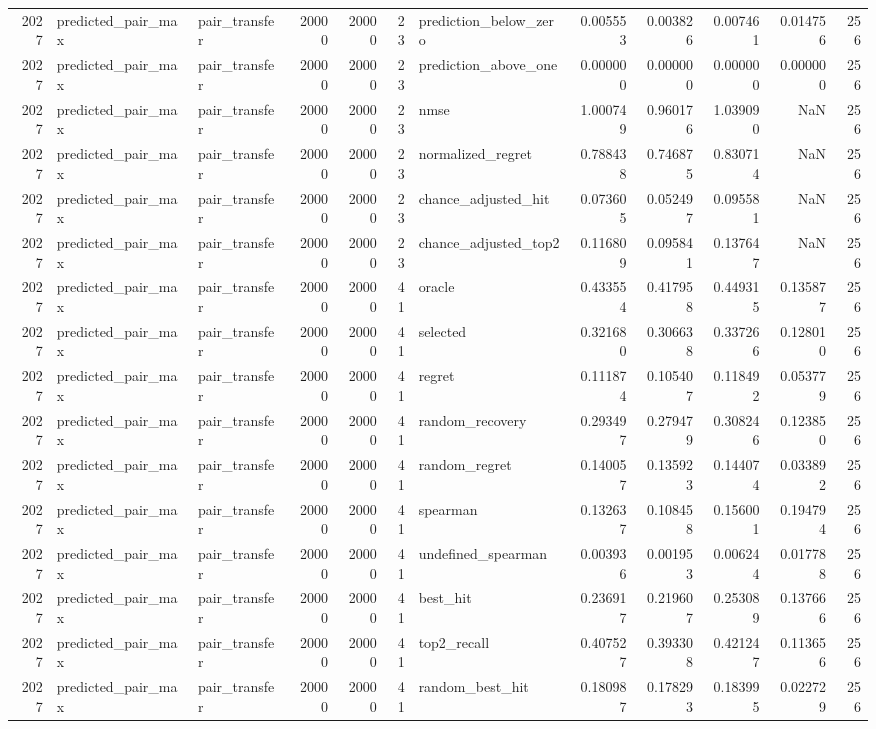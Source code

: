 \begin{tabular}{rllrrrlrrrrr}
2027 & predicted_pair_max & pair_transfer & 20000 & 20000 & 23 & prediction_below_zero & 0.005553 & 0.003826 & 0.007461 & 0.014756 & 256 \\
2027 & predicted_pair_max & pair_transfer & 20000 & 20000 & 23 & prediction_above_one & 0.000000 & 0.000000 & 0.000000 & 0.000000 & 256 \\
2027 & predicted_pair_max & pair_transfer & 20000 & 20000 & 23 & nmse & 1.000749 & 0.960176 & 1.039090 & NaN & 256 \\
2027 & predicted_pair_max & pair_transfer & 20000 & 20000 & 23 & normalized_regret & 0.788438 & 0.746875 & 0.830714 & NaN & 256 \\
2027 & predicted_pair_max & pair_transfer & 20000 & 20000 & 23 & chance_adjusted_hit & 0.073605 & 0.052497 & 0.095581 & NaN & 256 \\
2027 & predicted_pair_max & pair_transfer & 20000 & 20000 & 23 & chance_adjusted_top2 & 0.116809 & 0.095841 & 0.137647 & NaN & 256 \\
2027 & predicted_pair_max & pair_transfer & 20000 & 20000 & 41 & oracle & 0.433554 & 0.417958 & 0.449315 & 0.135877 & 256 \\
2027 & predicted_pair_max & pair_transfer & 20000 & 20000 & 41 & selected & 0.321680 & 0.306638 & 0.337266 & 0.128010 & 256 \\
2027 & predicted_pair_max & pair_transfer & 20000 & 20000 & 41 & regret & 0.111874 & 0.105407 & 0.118492 & 0.053779 & 256 \\
2027 & predicted_pair_max & pair_transfer & 20000 & 20000 & 41 & random_recovery & 0.293497 & 0.279479 & 0.308246 & 0.123850 & 256 \\
2027 & predicted_pair_max & pair_transfer & 20000 & 20000 & 41 & random_regret & 0.140057 & 0.135923 & 0.144074 & 0.033892 & 256 \\
2027 & predicted_pair_max & pair_transfer & 20000 & 20000 & 41 & spearman & 0.132637 & 0.108458 & 0.156001 & 0.194794 & 256 \\
2027 & predicted_pair_max & pair_transfer & 20000 & 20000 & 41 & undefined_spearman & 0.003936 & 0.001953 & 0.006244 & 0.017788 & 256 \\
2027 & predicted_pair_max & pair_transfer & 20000 & 20000 & 41 & best_hit & 0.236917 & 0.219607 & 0.253089 & 0.137666 & 256 \\
2027 & predicted_pair_max & pair_transfer & 20000 & 20000 & 41 & top2_recall & 0.407527 & 0.393308 & 0.421247 & 0.113656 & 256 \\
2027 & predicted_pair_max & pair_transfer & 20000 & 20000 & 41 & random_best_hit & 0.180987 & 0.178293 & 0.183995 & 0.022729 & 256 \\

\end{tabular}
